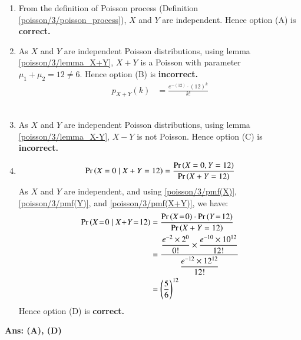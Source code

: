         
    \begin{enumerate}[label=\textbf{(\Alph*)}]
        \item From the definition of Poisson process (Definition \ref{poisson/3/poisson_process}), $X$ and $Y$ are independent. Hence option (A) is \textbf{correct.}\\
        \item As $X$ and $Y$ are independent Poisson distributions, using lemma \eqref{poisson/3/lemma_X+Y}, $X+ Y$ is a Poisson with parameter $\mu_1 + \mu_2 = 12 \neq 6$. Hence option (B) is \textbf{incorrect.}
        \begin{align}
             p_{X+Y}(k) &= \frac{e^{-(12)} \cdot (12)^k}{k!}\label{poisson/3/pmf(X+Y)}
        \end{align}\\
        \item  As $X$ and $Y$ are independent Poisson distributions, using lemma \eqref{poisson/3/lemma_X-Y}, $X-Y$ is not Poisson. Hence option (C) is \textbf{incorrect.}\\
        \item \begin{align}
            \Pr\left(X=0\mid X+Y=12\right) = \dfrac{\Pr\left(X=0, Y=12\right)}{\Pr\left(X+Y=12\right)}
        \end{align}
        As $X$ and $Y$ are independent, and using \eqref{poisson/3/pmf(X)}, \eqref{poisson/3/pmf(Y)}, and \eqref{poisson/3/pmf(X+Y)}, we have:
        \begin{align}
            \pr{X\!=\!0\mid X\!+\!Y\!=\!12} &= \frac{\pr{X\!=\!0} \cdot \pr{Y\!=\!12}}{\pr{X+Y=12}} \\
            &= \frac{\dfrac{e^{-2}\times 2^{0}}{0!} \times \dfrac{e^{-10}\times10^{12}}{12!}}{\dfrac{e^{-12}\times12^{12}}{12!}}\\
            &= \left(\dfrac{5}{6}\right)^{12}
        \end{align}
        Hence option (D) is \textbf{correct.}
    \end{enumerate}
    \textbf{Ans: (A), (D)}